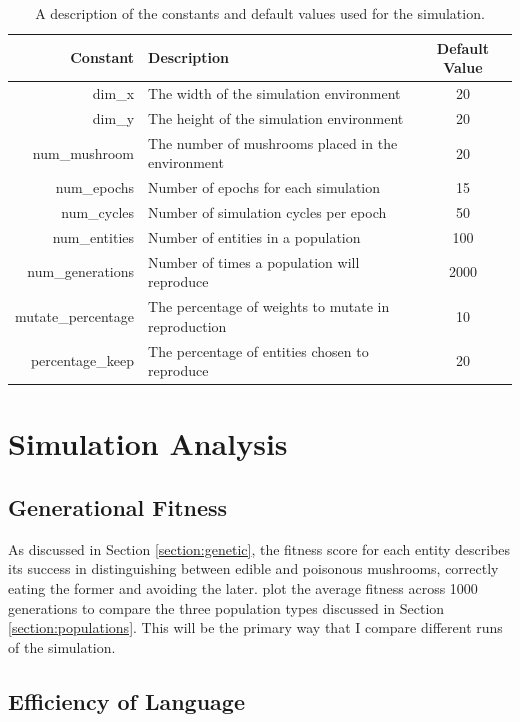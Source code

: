 \documentclass[12pt,a4paper]{report}
\begin{document}
\begin{table}[t]
\centering
 \begin{tabular}{ r | l | c}
 \bf{Constant} & \bf{Description} & \bf{Default Value} \\ [0.5ex] 
 \hline
dim\_x & The width of the simulation environment & 20 \\
dim\_y & The height of the simulation environment & 20 \\
num\_mushroom & The number of mushrooms placed in the environment & 20 \\
num\_epochs &  Number of epochs for each simulation & 15 \\ 
num\_cycles & Number of simulation cycles per epoch & 50 \\
num\_entities & Number of entities in a population & 100 \\
num\_generations & Number of times a population will reproduce & 2000 \\
mutate\_percentage & The percentage of weights to mutate in reproduction & 10 \\
percentage\_keep & The percentage of entities chosen to reproduce & 20 \\
\end{tabular}
\caption{A description of the constants and default values used for the simulation.}
\label{table:constants}
\end{table}

\section{Simulation Analysis}\label{section:analysis}

\subsection{Generational Fitness}

As discussed in Section \ref{section:genetic}, the fitness score for each entity describes its success in distinguishing between edible and poisonous mushrooms, correctly eating the former and avoiding the later. \cite{Cangelosi1998} plot the average fitness across 1000 generations to compare the three population types discussed in Section \ref{section:populations}. This will be the primary way that I compare different runs of the simulation.

\subsection{Efficiency of Language}\label{section:efficiency}
\end{document}
